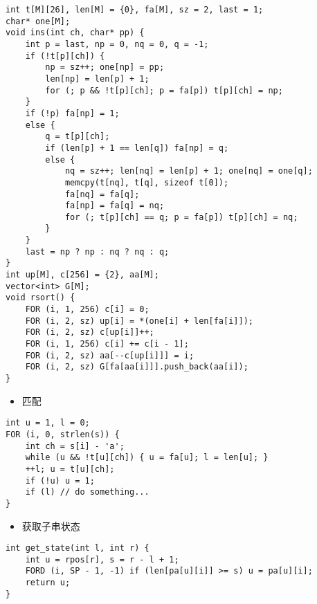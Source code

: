 \documentclass[]{article}
\providecommand{\tightlist}{%
  \setlength{\itemsep}{0pt}\setlength{\parskip}{0pt}}
\begin{document}
\begin{verbatim}
int t[M][26], len[M] = {0}, fa[M], sz = 2, last = 1;
char* one[M];
void ins(int ch, char* pp) {
    int p = last, np = 0, nq = 0, q = -1;
    if (!t[p][ch]) {
        np = sz++; one[np] = pp;
        len[np] = len[p] + 1;
        for (; p && !t[p][ch]; p = fa[p]) t[p][ch] = np;
    }
    if (!p) fa[np] = 1;
    else {
        q = t[p][ch];
        if (len[p] + 1 == len[q]) fa[np] = q;
        else {
            nq = sz++; len[nq] = len[p] + 1; one[nq] = one[q];
            memcpy(t[nq], t[q], sizeof t[0]);
            fa[nq] = fa[q];
            fa[np] = fa[q] = nq;
            for (; t[p][ch] == q; p = fa[p]) t[p][ch] = nq;
        }
    }
    last = np ? np : nq ? nq : q;
}
int up[M], c[256] = {2}, aa[M];
vector<int> G[M];
void rsort() {
    FOR (i, 1, 256) c[i] = 0;
    FOR (i, 2, sz) up[i] = *(one[i] + len[fa[i]]);
    FOR (i, 2, sz) c[up[i]]++;
    FOR (i, 1, 256) c[i] += c[i - 1];
    FOR (i, 2, sz) aa[--c[up[i]]] = i;
    FOR (i, 2, sz) G[fa[aa[i]]].push_back(aa[i]);
}
\end{verbatim}

\begin{itemize}
\tightlist
\item
  匹配
\end{itemize}

\begin{verbatim}
int u = 1, l = 0;
FOR (i, 0, strlen(s)) {
    int ch = s[i] - 'a';
    while (u && !t[u][ch]) { u = fa[u]; l = len[u]; }
    ++l; u = t[u][ch];
    if (!u) u = 1;
    if (l) // do something...
}
\end{verbatim}

\begin{itemize}
\tightlist
\item
  获取子串状态
\end{itemize}

\begin{verbatim}
int get_state(int l, int r) {
    int u = rpos[r], s = r - l + 1;
    FORD (i, SP - 1, -1) if (len[pa[u][i]] >= s) u = pa[u][i];
    return u;
}
\end{verbatim}
\end{document}
